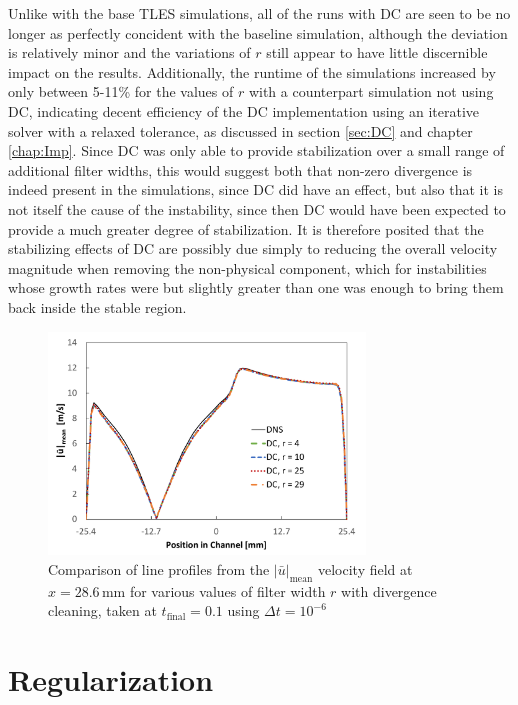 Unlike with the base TLES simulations, all of the runs with DC are seen to be no longer as perfectly concident with the baseline simulation, although the deviation is relatively minor and the variations of $r$ still appear to have little discernible impact on the results. Additionally, the runtime of the simulations increased by only between 5-11\% for the values of $r$ with a counterpart simulation not using DC, indicating decent efficiency of the DC implementation using an iterative solver with a relaxed tolerance, as discussed in section \ref{sec:DC} and chapter \ref{chap:Imp}. Since DC was only able to provide stabilization over a small range of additional filter widths, this would suggest both that non-zero divergence is indeed present in the simulations, since DC did have an effect, but also that it is not itself the cause of the instability, since then DC would have been expected to provide a much greater degree of stabilization. It is therefore posited that the stabilizing effects of DC are possibly due simply to reducing the overall velocity magnitude when removing the non-physical component, which for instabilities whose growth rates were but slightly greater than one was enough to bring them back inside the stable region.

\begin{figure}[!tb]
\centering
\includegraphics[width=0.75\textwidth]{figures/line_data_DC.pdf}
\caption{Comparison of line profiles from the $|\bar{u}|_{\mathrm{mean}}$ velocity field at $x=28.6\,\mathrm{mm}$ for various values of filter width $r$ with divergence cleaning, taken at $t_\mathrm{final}=0.1$ using $\Delta t=10^{-6}$}
\label{fig:line_data_DC}
\end{figure}

\section{Regularization}

